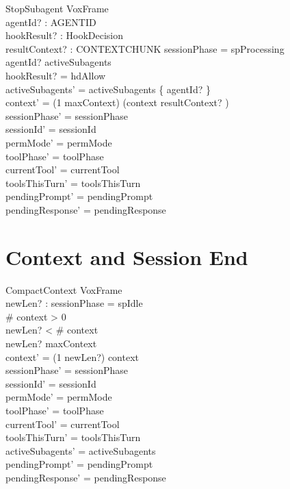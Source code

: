 \documentclass[a4paper,10pt,fleqn]{article}
\begin{document}
\begin{schema}{StopSubagent}
  VoxFrame \\
  agentId? : AGENTID \\
  hookResult? : HookDecision \\
  resultContext? : CONTEXTCHUNK
  \where
  sessionPhase = spProcessing \\
  agentId? \in activeSubagents \\
  hookResult? = hdAllow \\
  activeSubagents' = activeSubagents \setminus \{ agentId? \} \\
  context' = (1 \upto maxContext) \dres (context \cat \langle resultContext? \rangle) \\
  sessionPhase' = sessionPhase \\
  sessionId' = sessionId \\
  permMode' = permMode \\
  toolPhase' = toolPhase \\
  currentTool' = currentTool \\
  toolsThisTurn' = toolsThisTurn \\
  pendingPrompt' = pendingPrompt \\
  pendingResponse' = pendingResponse
\end{schema}

\section{Context and Session End}

\begin{schema}{CompactContext}
  VoxFrame \\
  newLen? : \nat
  \where
  sessionPhase = spIdle \\
  \# context > 0 \\
  newLen? < \# context \\
  newLen? \leq maxContext \\
  context' = (1 \upto newLen?) \dres context \\
  sessionPhase' = sessionPhase \\
  sessionId' = sessionId \\
  permMode' = permMode \\
  toolPhase' = toolPhase \\
  currentTool' = currentTool \\
  toolsThisTurn' = toolsThisTurn \\
  activeSubagents' = activeSubagents \\
  pendingPrompt' = pendingPrompt \\
  pendingResponse' = pendingResponse
\end{schema}
\end{document}
